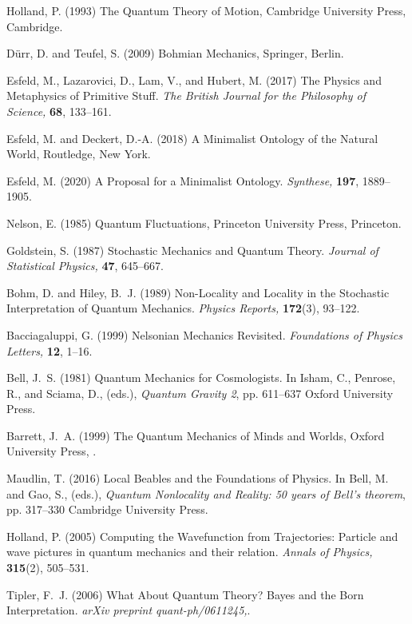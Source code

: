 \documentclass[onecolumn,secnumarabic,amsmath,amssymb,balancelastpage,nofootinbib]{article}
\begin{document}
\begin{thebibliography}{100}
Holland, P. (1993)
The Quantum Theory of Motion,
Cambridge University Press, Cambridge.

D\"{u}rr, D. and Teufel, S. (2009)
Bohmian Mechanics,
Springer, Berlin.

Esfeld, M., Lazarovici, D., Lam, V., and Hubert, M. (2017)
The Physics and Metaphysics of Primitive Stuff.
{\em The British Journal for the Philosophy of Science,} {\bf 68}, 133--161.

Esfeld, M. and Deckert, D.-A. (2018)
A Minimalist Ontology of the Natural World,
Routledge, New York.

Esfeld, M. (2020)
A Proposal for a Minimalist Ontology.
{\em Synthese,} {\bf 197}, 1889--1905.

Nelson, E. (1985)
Quantum Fluctuations,
Princeton University Press, Princeton.

Goldstein, S. (1987)
Stochastic Mechanics and Quantum Theory.
{\em Journal of Statistical Physics,} {\bf 47}, 645--667.

Bohm, D. and Hiley, B.~J. (1989)
Non-Locality and Locality in the Stochastic Interpretation of Quantum
  Mechanics.
{\em Physics Reports,} {\bf 172}(3), 93--122.

Bacciagaluppi, G. (1999)
Nelsonian Mechanics Revisited.
{\em Foundations of Physics Letters,} {\bf 12}, 1--16.

Bell, J.~S. (1981)
Quantum Mechanics for Cosmologists.
In Isham, C., Penrose, R., and Sciama, D., (eds.), \emph{Quantum Gravity 2},
  pp. 611--637 Oxford University Press.

Barrett, J.~A. (1999)
The Quantum Mechanics of Minds and Worlds,
Oxford University Press, .

Maudlin, T. (2016)
Local Beables and the Foundations of Physics.
In Bell, M. and Gao, S., (eds.), \emph{Quantum Nonlocality and Reality: 50
  years of Bell's theorem},  pp. 317--330 Cambridge University Press.

Holland, P. (2005)
Computing the Wavefunction from Trajectories: Particle and wave pictures in
  quantum mechanics and their relation.
{\em Annals of Physics,} {\bf 315}(2), 505--531.

Tipler, F.~J. (2006)
What About Quantum Theory? Bayes and the Born Interpretation.
{\em arXiv preprint quant-ph/0611245,}.


\end{thebibliography}
\end{document}
